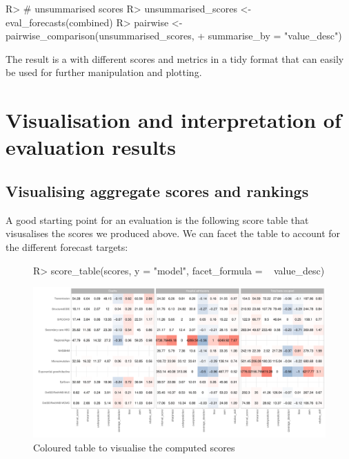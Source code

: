 \documentclass[article]{jss}
\begin{document}
\begin{Schunk}
\begin{Sinput}
R> # unsummarised scores
R> unsummarised_scores <- eval_forecasts(combined)
R> pairwise <- pairwise_comparison(unsummarised_scores, 
+                                  summarise_by = "value_desc")
\end{Sinput}
\end{Schunk}

The result is a  with different scores and metrics in a tidy format that can easily be used for further manipulation and plotting. 

\section{Visualisation and interpretation of evaluation results}

\subsection{Visualising aggregate scores and rankings}
A good starting point for an evaluation is the following score table that visusalises the scores we produced above. We can facet the table to account for the different forecast targets: 

\begin{figure}[h]
\centering
\begin{Schunk}
\begin{Sinput}
R> score_table(scores, y = "model", facet_formula = ~ value_desc)
\end{Sinput}
\end{Schunk}
\includegraphics{plots/plot-score-table}
\caption{\label{fig:score-table} Coloured table to visualise the computed scores}
\end{figure}
\end{document}
